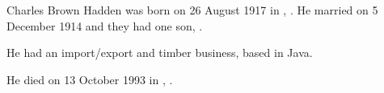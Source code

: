 
Charles Brown Hadden was born on 26 August 1917 in , .
He married  on 5 December 1914\cite{JHMbible,FlickrJohnHillTree}
and they had one son, .

He had an import/export and timber business, based in Java.

He died on 13 October 1993 in , .\cite{CharlesBrownHaddenDeath}
